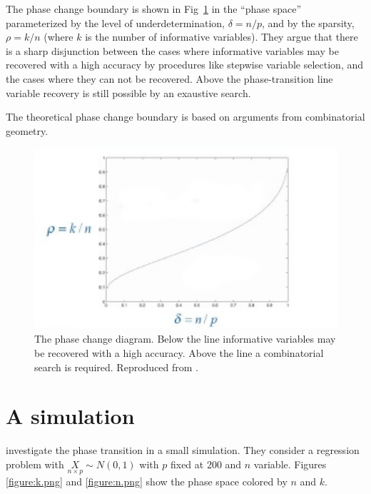 \documentclass[11pt]{article}
\begin{document}
The phase change boundary is
shown in Fig~\ref{figure:phase-diagram-equivalence.png} in the ``phase space'' parameterized by the level of underdetermination,
$\delta = n/p$, and by the sparsity, $\rho =k/n$ (where $k$ is the number of informative variables).  
They argue that there is a sharp disjunction between the cases where informative variables may be recovered with a high
accuracy by procedures like stepwise variable selection, and the cases where they can not be recovered. Above the
phase-transition line variable recovery is still possible by an exaustive search.

The theoretical phase change boundary is based on arguments from combinatorial geometry.

\begin{figure}[tbhp] 
    \centering
    \includegraphics[totalheight=6cm,width=12cm]{./figs/phase2.png} %
    \caption{The phase change diagram. Below the line informative variables may be recovered with a high
      accuracy. Above the line a combinatorial search is required. Reproduced from .}
    \label{figure:phase-diagram-equivalence.png} 
    \vspace{4ex}
\end{figure}

\FloatBarrier
\section{A simulation}
\cite{Donoho.and.Stodden.2006} investigate the phase transition in a small simulation.  They consider a regression
problem with $\underset{n\times p}{X}\sim N(0,1)$ with $p$ fixed at 200 and $n$ variable. Figures \ref{figure:k.png} and
\ref{figure:n.png} show the phase space colored by $n$ and $k.$
\end{document}
